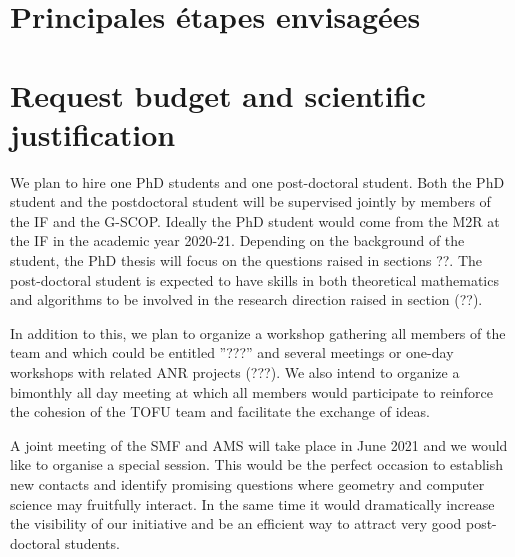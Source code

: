 \documentclass[14pt,fleqn]{article}
\begin{document}
\section{Principales étapes envisagées}


\section{ Request budget and scientific justification}

We plan to hire one PhD students and one post-doctoral student. 
Both the PhD student
and the postdoctoral student
will be supervised jointly 
by members of the IF and the G-SCOP.
Ideally the PhD student would
come from the M2R at the IF 
in the academic year 2020-21.
Depending on the background of the student, the PhD thesis will focus on the
questions raised in sections ??.
The post-doctoral student is expected to have skills in both
theoretical mathematics 
and algorithms
to be involved in the research direction raised in section (??).

In addition to this, we plan to organize a workshop gathering all members of the
team and which could be entitled ”???” and several meetings
or one-day workshops with related ANR projects (???).
We also intend to organize 
a bimonthly all day meeting 
at which all members would participate
to reinforce the cohesion of the TOFU team
and facilitate the exchange of ideas.

A joint meeting of the SMF and AMS
will take place in June 2021
and we would like to organise a
special session.
This would be the perfect occasion to establish new contacts and identify promising questions where
geometry and computer science may fruitfully interact. In the same time it would dramatically
increase the visibility of our initiative and be an efficient way to attract very good post-doctoral
students.

\vspace{.5in}
 
\end{document}
